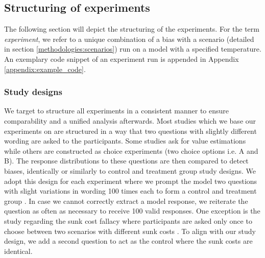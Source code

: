\subsection{Structuring of experiments}
\par The following section will depict the structuring of the experiments. For the term \textit{experiment}, we refer to a unique combination of a bias with a scenario (detailed in section \ref{methodologies:scenarios}) run on a model with a specified temperature. An exemplary code snippet of an experiment run is appended in Appendix \ref{appendix:example_code}.

\subsubsection{Study designs}
\par We target to structure all experiments in a consistent manner to ensure comparability and a unified analysis afterwards. Most studies which we base our experiments on are structured in a way that two  questions with slightly different wording are asked to the participants. Some studies ask for value estimations while others are constructed as choice experiments (two choice options i.e. A and B). The response distributions to these questions are then compared to detect biases, identically or similarly to control and treatment group study designs. We adopt this design for each experiment where we prompt the model two questions with slight variations in wording 100 times each to form a control and treatment group \parencite{cohen1988statistical,morris2002combining}. In case we cannot correctly extract a model response, we reiterate the question as often as necessary to receive 100 valid responses. One exception is the study regarding the sunk cost fallacy where participants are asked only once to choose between two scenarios with different sunk costs \parencite{arkes1985psychology}. To align with our study design, we add a second question to act as the control where the sunk costs are identical.

